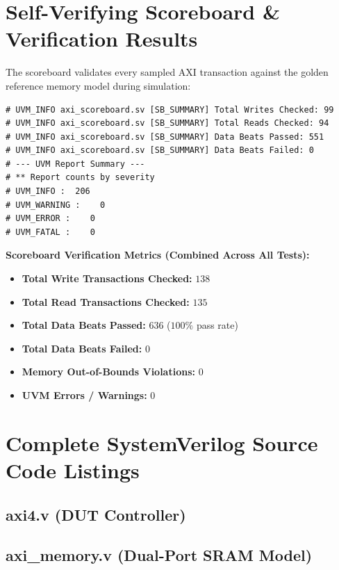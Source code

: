 \documentclass[10pt,a4paper]{article}
\begin{document}
\section{Self-Verifying Scoreboard \& Verification Results}
The scoreboard validates every sampled AXI transaction against the golden reference memory model during simulation:
\begin{lstlisting}[style=logstyle]
# UVM_INFO axi_scoreboard.sv [SB_SUMMARY] Total Writes Checked: 99
# UVM_INFO axi_scoreboard.sv [SB_SUMMARY] Total Reads Checked: 94
# UVM_INFO axi_scoreboard.sv [SB_SUMMARY] Data Beats Passed: 551
# UVM_INFO axi_scoreboard.sv [SB_SUMMARY] Data Beats Failed: 0
# --- UVM Report Summary ---
# ** Report counts by severity
# UVM_INFO :  206
# UVM_WARNING :    0
# UVM_ERROR :    0
# UVM_FATAL :    0
\end{lstlisting}

\textbf{Scoreboard Verification Metrics (Combined Across All Tests):}
\begin{itemize}
    \item \textbf{Total Write Transactions Checked:} $138$
    \item \textbf{Total Read Transactions Checked:} $135$
    \item \textbf{Total Data Beats Passed:} $636$ ($100\%$ pass rate)
    \item \textbf{Total Data Beats Failed:} $0$
    \item \textbf{Memory Out-of-Bounds Violations:} $0$
    \item \textbf{UVM Errors / Warnings:} $0$
\end{itemize}

\newpage
\section{Complete SystemVerilog Source Code Listings}

\subsection{axi4.v (DUT Controller)}


\subsection{axi\_memory.v (Dual-Port SRAM Model)}

\end{document}

